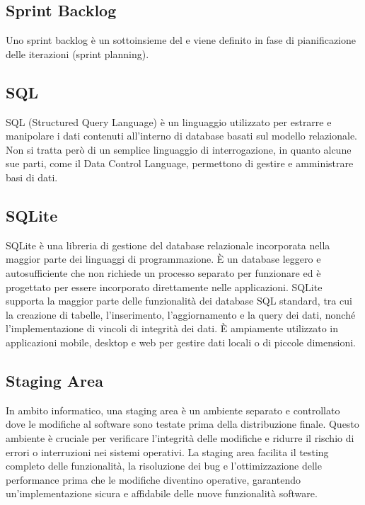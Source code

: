 \vspace{2em}
\subsection*{Sprint Backlog}
\par Uno sprint backlog è un sottoinsieme del  e viene definito in fase di pianificazione delle iterazioni (sprint planning).

\vspace{2em}
\subsection*{SQL}
SQL (Structured Query Language) è un linguaggio utilizzato per estrarre e manipolare i dati contenuti all'interno di database basati sul modello relazionale. Non si tratta però di un semplice linguaggio di interrogazione, in quanto alcune sue parti, come il Data Control Language, permettono di gestire e amministrare basi di dati.

\vspace{2em}
\subsection*{SQLite}
\par SQLite è una libreria di gestione del database relazionale incorporata nella maggior parte dei linguaggi di programmazione. È un database leggero e autosufficiente che non richiede un processo separato per funzionare ed è progettato per essere incorporato direttamente nelle applicazioni. SQLite supporta la maggior parte delle funzionalità dei database SQL standard, tra cui la creazione di tabelle, l'inserimento, l'aggiornamento e la query dei dati, nonché l'implementazione di vincoli di integrità dei dati. È ampiamente utilizzato in applicazioni mobile, desktop e web per gestire dati locali o di piccole dimensioni.

\vspace{2em}
\subsection*{Staging Area}
\par In ambito informatico, una staging area è un ambiente separato e controllato dove le modifiche al software sono testate prima della distribuzione finale. Questo ambiente è cruciale per verificare l'integrità delle modifiche e ridurre il rischio di errori o interruzioni nei sistemi operativi. La staging area facilita il testing completo delle funzionalità, la risoluzione dei bug e l'ottimizzazione delle performance prima che le modifiche diventino operative, garantendo un'implementazione sicura e affidabile delle nuove funzionalità software.

